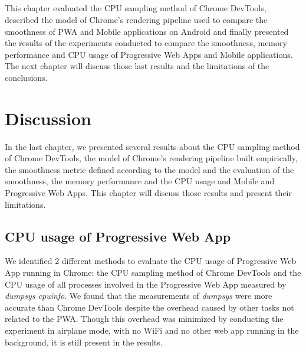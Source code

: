 \documentclass{kththesis}
\begin{document}
\paragraph{}
This chapter evaluated the CPU sampling method of Chrome DevTools, described the model of Chrome's rendering pipeline used to compare the smoothness of PWA and Mobile applications on Android and finally presented the results of the experiments conducted to compare the smoothness, memory performance and CPU usage of Progressive Web Apps and Mobile applications. The next chapter will discuss those last results and the limitations of the conclusions.


\chapter{Discussion}

In the last chapter, we presented several results about the CPU sampling method of Chrome DevTools, the model of Chrome's rendering pipeline built empirically, the smoothness metric defined according to the model and the evaluation of the smoothness, the memory performance and the CPU usage and Mobile and Progressive Web Apps. This chapter will discuss those results and present their limitations.
\section{CPU usage of Progressive Web App}
We identified 2 different methods to evaluate the CPU usage of Progressive Web App running in Chrome: the CPU sampling method of Chrome DevTools and the CPU usage of all processes involved in the Progressive Web App measured by \textit{dumpsys cpuinfo}. We found that the measurements of \textit{dumpsys} were more accurate than Chrome DevTools despite the overhead caused by other tasks not related to the PWA. Though this overhead was minimized by conducting the experiment in airplane mode, with no WiFi and no other web app running in the background, it is still present in the results. 
\end{document}
